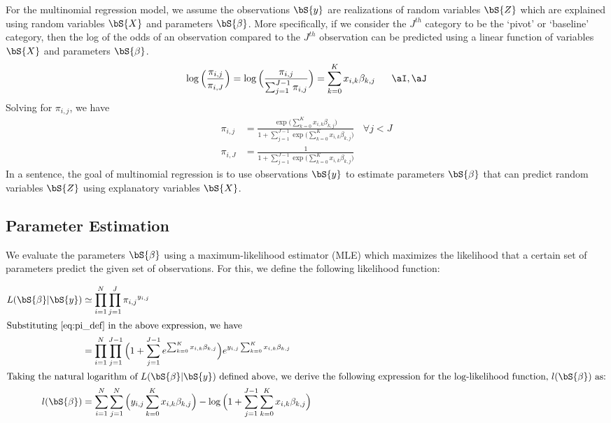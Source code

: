 For the multinomial regression model, we assume the observations $\bS{y}$ are realizations of random variables $\bS{Z}$ which are explained using random variables $\bS{X}$ and parameters $\bS{\beta}$. More specifically, if we consider the $J^{th}$ category to be the `pivot' or `baseline' category, then the log of the odds of an observation compared to the  $J^{th}$ observation can be predicted using a linear function of variables $\bS{X}$ and parameters $\bS{\beta}$.
\begin{equation}
 \log \Big( \frac{\pi_{i,j}}{\pi_{i,J}}\Big) =  \log \Big( \frac{\pi_{i,j}}{\sum_{j=1}^{J-1}\pi_{i,j}}\Big) = \sum_{k=0}^{K} x_{i,k}\beta_{k,j}  \ \ \ \ \ \aI, \aJ
\end{equation}
Solving for $\pi_{i,j}$, we have
\begin{subequations}
\label{eq:pi_def}
\begin{align}
\pi_{i,j} &= \frac{\exp \big( {\sum_{k=0}^{K} x_{i,k}\beta_{k,j}}\big)}{1 + \sum_{j=1}^{J-1}\exp{\big( \sum_{k=0}^{K} x_{i,k}\beta_{k,j}\big)}}\ \ \ \  \forall j < J\\
\pi_{i,J} &= \frac{1}{1 + \sum_{j=1}^{J-1}\exp{\big( \sum_{k=0}^{K} x_{i,k}\beta_{k,j}\big)}} 
\end{align}
\end{subequations}
In a sentence, the goal of multinomial regression is to use observations $\bS{y}$ to estimate parameters $\bS{\beta}$ that can predict random variables $\bS{Z}$ using explanatory variables $\bS{X}$. 

\subsection{Parameter Estimation}
We evaluate the parameters $\bS{\beta}$ using a maximum-likelihood estimator (MLE) which maximizes the likelihood that a certain set of parameters predict the given set of observations. For this, we define the following likelihood function:

\begin{align}
L(\bS{\beta}|\bS{y}) &\simeq \prod_{i=1}^{N}\prod_{j=1}^{J}{\pi_{i,j}}^{y_{i,j}} \\
\intertext{Substituting \eqref{eq:pi_def} in the above expression, we have}
&= \prod_{i=1}^{N}\prod_{j=1}^{J-1} \Big( 1 + \sum_{j=1}^{J-1} e^{\sum_{k=0}^{K} x_{i,k}\beta_{k,j}} \Big)  e^{y_{i,j} \sum_{k=0}^{K} x_{i,k}\beta_{k,j}} \\
\intertext{Taking the natural logarithm of $L(\bS{\beta}|\bS{y})$ defined above, we derive the following expression for the log-likelihood function, $l(\bS{\beta})$ as:}
l(\bS{\beta}) &= \sum_{i=1}^{N}\sum_{j=1}^{N} \Big( y_{i,j} \sum_{k=0}^{K} x_{i,k}\beta_{k,j} \Big) - \log \Big( 1 + \sum_{j=1}^{J-1} \sum_{k=0}^{K} x_{i,k}\beta_{k,j}\Big) \label{eq:log_lik}
\end{align}

